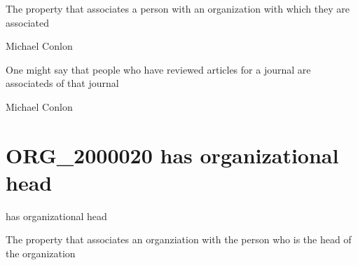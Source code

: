 \documentclass[letterpaper,10pt,english]{sphinxmanual}
\begin{document}
\begin{sphinxShadowBox}

\sphinxAtStartPar
The property that associates a person with an organization with which they are associated
\end{sphinxShadowBox}

\begin{sphinxShadowBox}

\sphinxAtStartPar
Michael Conlon 
\end{sphinxShadowBox}

\begin{sphinxShadowBox}

\sphinxAtStartPar
One might say that people who have reviewed articles for a journal are associateds of that journal
\end{sphinxShadowBox}

\begin{sphinxShadowBox}

\sphinxAtStartPar
Michael Conlon 
\end{sphinxShadowBox}
\begin{quote}
\label{\detokenize{doc-ORG_2000020:org-2000020}}\label{\detokenize{doc-ORG_2000020:has-organizational-head}}\label{\detokenize{doc-ORG_2000020:org-2000020}}
\ignorespaces \end{quote}


\section{ORG\_2000020 \sphinxhyphen{} has organizational head}
\label{\detokenize{doc-ORG_2000020:org-2000020-has-organizational-head}}\label{\detokenize{doc-ORG_2000020:index-0}}\label{\detokenize{doc-ORG_2000020::doc}}
\begin{sphinxShadowBox}

\sphinxAtStartPar
has organizational head
\end{sphinxShadowBox}

\begin{sphinxShadowBox}

\sphinxAtStartPar
The property that associates an organziation with the person who is the head of the organization
\end{sphinxShadowBox}
\end{document}
